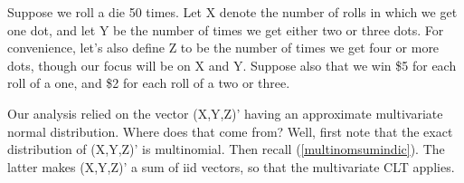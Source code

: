 Suppose we roll a die 50 times.  Let X denote the number of rolls in
which we get one dot, and let Y be the number of times we get either two
or three dots.  For convenience, let's also define Z to be the number of
times we get four or more dots, though our focus will be on X and Y.
Suppose also that we win \$5 for each roll of a one, and \$2 for each
roll of a two or three.

Our analysis relied on the vector (X,Y,Z)' having an approximate
multivariate normal distribution.  Where does that come from?  Well,
first note that the exact distribution of (X,Y,Z)' is multinomial.  Then
recall (\ref{multinomsumindic}).  The latter makes (X,Y,Z)' a sum of
iid vectors, so that the multivariate CLT applies.


